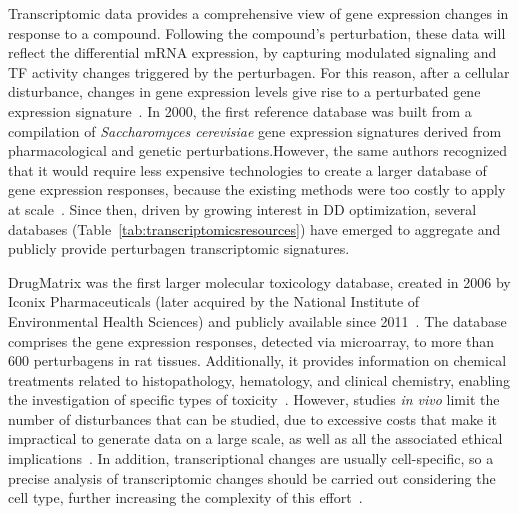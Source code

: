 Transcriptomic data provides a comprehensive view of gene expression changes in response to a compound. 
Following the compound's perturbation, these data will reflect the differential \gls{mRNA} expression, by capturing modulated signaling and \gls{TF} activity changes triggered by the perturbagen.
For this reason, after a cellular disturbance, changes in gene expression levels give rise to a perturbated gene expression signature~\cite{RN114}.
In 2000, the first reference database was built from a compilation of \textit{Saccharomyces cerevisiae} gene expression signatures derived from pharmacological and genetic perturbations.However, the same authors recognized that it would require less expensive technologies to create a larger database of gene expression responses, because the existing methods were too costly to apply at scale~\cite{RN115, RN116, RN117}.
Since then, driven by growing interest in \gls{DD} optimization, several databases (Table~\ref{tab:transcriptomicsresources}) have emerged to aggregate and publicly provide perturbagen transcriptomic signatures.

DrugMatrix was the first larger molecular toxicology database, created in 2006 by Iconix Pharmaceuticals (later acquired by the National Institute of Environmental Health Sciences) and publicly available since 2011~\cite{RN115, RN118, RN119}. 
The database comprises the gene expression responses, detected via microarray, to more than 600 perturbagens in rat tissues. 
Additionally, it provides information on chemical treatments related to histopathology, hematology, and clinical chemistry, enabling the investigation of specific types of toxicity~\cite{RN121}. 
However, studies \textit{in vivo} limit the number of disturbances that can be studied, due to excessive costs that make it impractical to generate data on a large scale, as well as all the associated ethical implications~\cite{RN34}. 
In addition, transcriptional changes are usually cell-specific, so a precise analysis of transcriptomic changes should be carried out considering the cell type, further increasing the complexity of this effort~\cite{RN86}.

